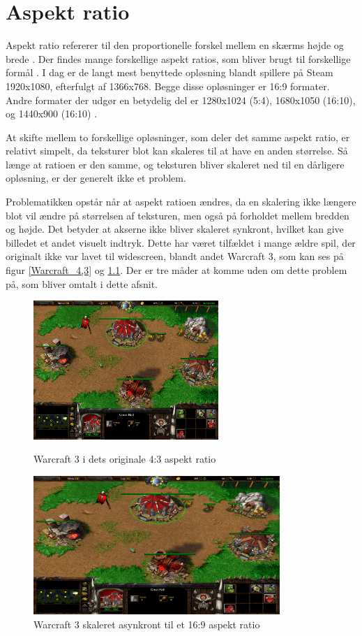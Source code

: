 \documentclass[Main.tex]{AspectRatio.tex}
\begin{document}
\chapter{Aspekt ratio}

Aspekt ratio refererer til den proportionelle forskel mellem en skærms højde og brede \cite{Gibson}. Der findes mange forskellige aspekt ratios, som bliver brugt til forskellige formål \cite{CommonResolutions}. I dag er de langt mest benyttede opløsning blandt spillere på Steam 1920x1080, efterfulgt af 1366x768. Begge disse opløsninger er 16:9 formater. Andre formater der udgør en betydelig del er 1280x1024 (5:4), 1680x1050 (16:10), og 1440x900 (16:10) \cite{Steam}.

At skifte mellem to forskellige opløsninger, som deler det samme aspekt ratio, er relativt simpelt, da teksturer blot kan skaleres til at have en anden størrelse. Så længe at ratioen er den samme, og teksturen bliver skaleret ned til en dårligere opløsning, er der generelt ikke et problem. 

Problematikken opstår når at aspekt ratioen ændres, da en skalering ikke længere blot vil ændre på størrelsen af teksturen, men også på forholdet mellem bredden og højde. Det betyder at akserne ikke bliver skaleret synkront, hvilket kan give billedet et andet visuelt indtryk. Dette har været tilfældet i mange ældre spil, der originalt ikke var lavet til widescreen, blandt andet Warcraft 3\cite{Warcraft3Game}, som kan ses på figur \ref{Warcraft_4,3} og \ref{Warcraft_16,9}. \cite{Wills} Der er tre måder at komme uden om dette problem på, som bliver omtalt i dette afsnit.

\begin{figure}[h]
\centering
\parbox{7cm}{   
\includegraphics[width = 7cm]{billeder/Warcraft_4,3}
\caption{Warcraft 3 i dets originale 4:3 aspekt ratio}    
\label{Warcraft_4,3}}
\qquad
\begin{minipage}{9.33cm}
\includegraphics[width = 9.33cm]{billeder/Warcraft_16,9}
\caption{Warcraft 3 skaleret asynkront til et 16:9 aspekt ratio}    
\label{Warcraft_16,9}
\end{minipage}
\end{figure}
\end{document}
